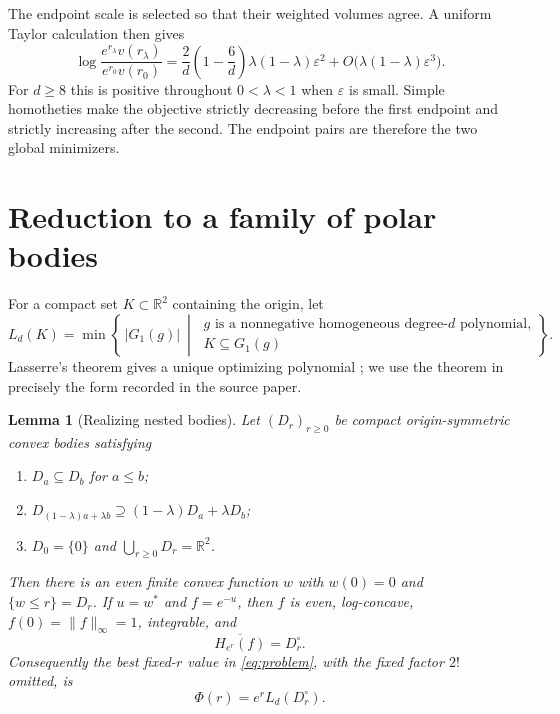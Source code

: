 \documentclass[11pt]{article}
\newtheorem{lemma}{Lemma}
\newcommand{\R}{\mathbb R}
\newcommand{\eps}{\varepsilon}
\begin{document}
The endpoint scale is selected so that their weighted volumes agree.  A
uniform Taylor calculation then gives
\[
 \log\frac{e^{r_\lambda}v(r_\lambda)}{e^{r_0}v(r_0)}
 =\frac2d\left(1-\frac6d\right)\lambda(1-\lambda)\eps^2
  +O\bigl(\lambda(1-\lambda)\eps^3\bigr).
\]
For $d\geq8$ this is positive throughout $0<\lambda<1$ when $\eps$ is small.
Simple homotheties make the objective strictly decreasing before the first
endpoint and strictly increasing after the second.  The endpoint pairs are
therefore the two global minimizers.

\section{Reduction to a family of polar bodies}

For a compact set $K\subset\R^2$ containing the origin, let
\[
 L_d(K)=\min\left\{\,|G_1(g)|\ \middle|\
 \begin{array}{l}
 g\text{ is a nonnegative homogeneous degree-$d$ polynomial,}\\[-2pt]
 K\subseteq G_1(g)
 \end{array}\right\}.
\]
Lasserre's theorem gives a unique optimizing polynomial \cite{Lasserre}; we
use the theorem in precisely the form recorded in the source paper.

\begin{lemma}[Realizing nested bodies]\label{lem:realize}
Let $(D_r)_{r\geq0}$ be compact origin-symmetric convex bodies satisfying
\begin{enumerate}
\item $D_a\subseteq D_b$ for $a\leq b$;
\item $D_{(1-\lambda)a+\lambda b}\supseteq
 (1-\lambda)D_a+\lambda D_b$;
\item $D_0=\{0\}$ and $\bigcup_{r\geq0}D_r=\R^2$.
\end{enumerate}
Then there is an even finite convex function $w$ with $w(0)=0$ and
$\{w\leq r\}=D_r$.  If $u=w^*$ and $f=e^{-u}$, then $f$ is even,
log-concave, $f(0)=\|f\|_\infty=1$, integrable, and
\begin{equation}\label{eq:polar-reduction}
 \overline{H_{e^r}(f)}=D_r^\circ .
\end{equation}
Consequently the best fixed-$r$ value in \eqref{eq:problem}, with the fixed
factor $2!$ omitted, is
\begin{equation}\label{eq:objective}
 \Phi(r)=e^r L_d(D_r^\circ).
\end{equation}
\end{lemma}
\end{document}
